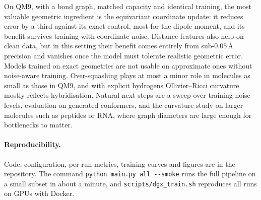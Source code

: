 \documentclass[11pt,a4paper]{article}
\begin{document}
On QM9, with a bond graph, matched capacity and identical training, the most valuable
geometric ingredient is the equivariant coordinate update: it reduces error by a third against
its exact control, most for the dipole moment, and its benefit survives training with
coordinate noise. Distance features also help on clean data, but in this setting their benefit
comes entirely from sub-$0.05$\,\AA{} precision and vanishes once the model must tolerate
realistic geometric error. Models trained on exact geometries are not usable on approximate ones
without noise-aware training. Over-squashing plays at most a minor role in molecules as small as
those in QM9, and with explicit hydrogens Ollivier--Ricci curvature mostly reflects
hybridisation. Natural next steps are a sweep over training noise levels, evaluation on
generated conformers, and the curvature study on larger molecules such as peptides or RNA,
where graph diameters are large enough for bottlenecks to matter.

\paragraph{Reproducibility.} Code, configuration, per-run metrics, training curves and figures
are in the repository. The command \texttt{python main.py all -{}-smoke} runs the full
pipeline on a small subset in about a minute, and \texttt{scripts/dgx\_train.sh} reproduces
all runs on GPUs with Docker.
\end{document}
